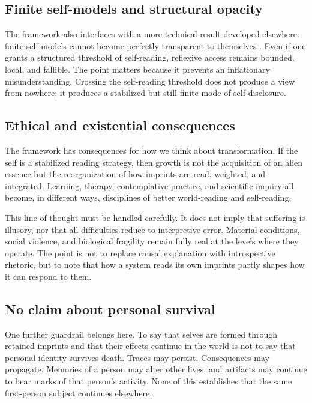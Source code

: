 \documentclass[12pt]{article}
\begin{document}
\subsection{Finite self-models and structural opacity}

The framework also interfaces with a more technical result developed elsewhere: finite self-models cannot become perfectly transparent to themselves \cite{Liu2026CS_III}. Even if one grants a structured threshold of self-reading, reflexive access remains bounded, local, and fallible. The point matters because it prevents an inflationary misunderstanding. Crossing the self-reading threshold does not produce a view from nowhere; it produces a stabilized but still finite mode of self-disclosure.

\subsection{Ethical and existential consequences}

The framework has consequences for how we think about transformation. If the self is a stabilized reading strategy, then growth is not the acquisition of an alien essence but the reorganization of how imprints are read, weighted, and integrated. Learning, therapy, contemplative practice, and scientific inquiry all become, in different ways, disciplines of better world-reading and self-reading.

This line of thought must be handled carefully. It does not imply that suffering is illusory, nor that all difficulties reduce to interpretive error. Material conditions, social violence, and biological fragility remain fully real at the levels where they operate. The point is not to replace causal explanation with introspective rhetoric, but to note that how a system reads its own imprints partly shapes how it can respond to them.

\subsection{No claim about personal survival}

One further guardrail belongs here. To say that selves are formed through retained imprints and that their effects continue in the world is not to say that personal identity survives death. Traces may persist. Consequences may propagate. Memories of a person may alter other lives, and artifacts may continue to bear marks of that person's activity. None of this establishes that the same first-person subject continues elsewhere.
\end{document}

